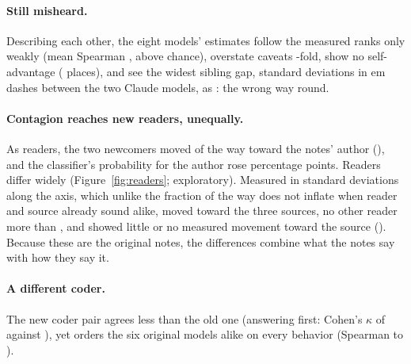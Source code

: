 \documentclass[11pt]{article}
\begin{document}
\paragraph{Still misheard.}
Describing each other, the eight models' estimates follow the measured ranks only weakly (mean Spearman \pEightRank{}, above chance), overstate caveats \pEightCaveat{}-fold, show no self-advantage (\pEightSelf{} places), and see the widest sibling gap, \pEightEmMeasured{} standard deviations in em dashes between the two Claude models, as \pEightEmSeen{}: the wrong way round.

\paragraph{Contagion reaches new readers, unequally.}
As readers, the two newcomers moved \pEightConNew{} of the way toward the notes' author (\pEightConNewCI), and the classifier's probability for the author rose \pEightConProb{} percentage points.
Readers differ widely (Figure~\ref{fig:readers}; exploratory).
Measured in standard deviations along the axis, which unlike the fraction of the way does not inflate when reader and source already sound alike, \pEightMostReader{} moved \pEightMostRange{} toward the three sources, no other reader more than \pEightOthersMax, and \pEightLeastReader{} showed little or no measured movement toward the source (\pEightLeastRange).
Because these are the original notes, the differences combine what the notes say with how they say it.

\paragraph{A different coder.}
The new coder pair agrees less than the old one (answering first: Cohen's $\kappa$ \citep{cohen1960kappa} of \pEightKappaAF{} against \pEightKappaAFOld), yet orders the six original models alike on every behavior (Spearman \pEightCodedRhoLow{} to \pEightCodedRhoHigh).
\end{document}
